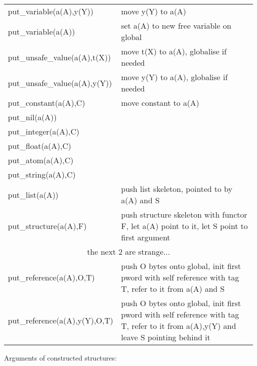 \begin{tabular}{|l|p{10cm}|}
\hline
put_variable(a(A),y(Y))         & move y(Y) to a(A)               \\
put_variable(a(A))              & set a(A) to new free variable on global  \\
put_unsafe_value(a(A),t(X))     & move t(X) to a(A), globalise if needed                          \\
put_unsafe_value(a(A),y(Y))     & move y(Y) to a(A), globalise if needed                          \\
put_constant(a(A),C)            & move constant to a(A)           \\
put_nil(a(A))                   &               \\
put_integer(a(A),C)             &               \\
put_float(a(A),C)               &               \\
put_atom(a(A),C)                &               \\
put_string(a(A),C)              &               \\
put_list(a(A))                  & push list skeleton, pointed to by a(A) and S          \\
put_structure(a(A),F)           & push structure skeleton with functor F,
                                let a(A) point to it, let S point to first argument\\
\hline
\multicolumn{2}{|c|}{the next 2 are strange...}\\
\hline
put_reference(a(A),O,T)         & push O bytes onto global, init first pword with self reference with tag T,
                                refer to it from a(A) and S\\
put_reference(a(A),y(Y),O,T)    &  push O bytes onto global, init first pword with self reference with tag T,
                                refer to it from a(A),y(Y) and leave S pointing behind it\\
\hline
\end{tabular}

Arguments of constructed structures:

